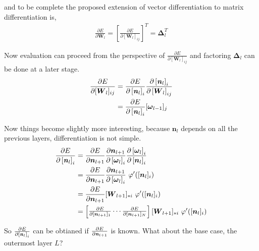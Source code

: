 \documentclass[12pt,letterpaper]{article}
\begin{document}
and to be complete the proposed extension of vector differentiation to matrix differentiation is,
\begin{align}
\frac{\partial E}{\partial \boldsymbol{W}_l} 
= 
\left[ \frac{\partial E}{\partial [\boldsymbol{W}_{l}]_{ij}} \right]^T
=
\boldsymbol{\Delta}_l^T
\end{align}

Now evaluation can proceed from the perspective of $\frac{\partial E}{\partial [\boldsymbol{W}_l]_{ij}}$ and factoring $\boldsymbol{\Delta}_l$ can be done at a later stage.
\begin{align}
\frac{\partial E}{\partial [\boldsymbol{W}_l]_{ij}}
&=
\frac{\partial E}{ \partial \left[ \textbf{\textit{n}}_l \right]_i }
\frac{ \partial \left[ \textbf{\textit{n}}_l \right]_i }{ \partial \left[ \boldsymbol{W}_l \right]_{ij} } \\ 
&=
\frac{\partial E}{ \partial \left[ \textbf{\textit{n}}_l \right]_i }[\boldsymbol{\omega}_{l-1}]_j
\end{align}

Now things become slightly more interesting, because $\boldsymbol{n}_l$ depends on all the previous layers, differentiation is not simple.
\begin{align}
\frac{\partial E}{ \partial \left[ \textbf{\textit{n}}_l \right]_i } 
&= 
\frac{\partial E}{\partial \boldsymbol{n}_{l+1}}
\frac{\partial \boldsymbol{n}_{l+1}}{ \partial \left[ \boldsymbol{\omega}_l \right]_i }
\frac{\partial \left[ \boldsymbol{\omega}_l \right]_i}{ \partial \left[ \boldsymbol{n}_l \right]_i } \\
&=
\frac{\partial E}{\partial \boldsymbol{n}_{l+1}}
\frac{\partial \boldsymbol{n}_{l+1}}{ \partial \left[ \boldsymbol{\omega}_l \right]_i }
\ \varphi'([\boldsymbol{n}_l]_i) \\
&=
\frac{\partial E}{\partial \boldsymbol{n}_{l+1}}
[\boldsymbol{W}_{l+1}]_{*i}
\ \varphi'([\boldsymbol{n}_l]_i) \\
&= 
\begin{bmatrix}
\frac{\partial E}{\partial [\boldsymbol{n}_{l+1}]_1} 
\cdots 
\frac{\partial E}{\partial [\boldsymbol{n}_{l+1}]_N}
\end{bmatrix}
[\boldsymbol{W}_{l+1}]_{*i} 
\ \varphi'([\boldsymbol{n}_l]_i) \\
\end{align}

So 
$\frac{\partial E}{ \partial \left[ \textbf{\textit{n}}_l \right]_i }$
can be obtianed if 
$\frac{\partial E}{ \partial \textbf{\textit{n}}_{l+1} }$ is known.  What about the base case, the outermost layer $L$?
\end{document}
